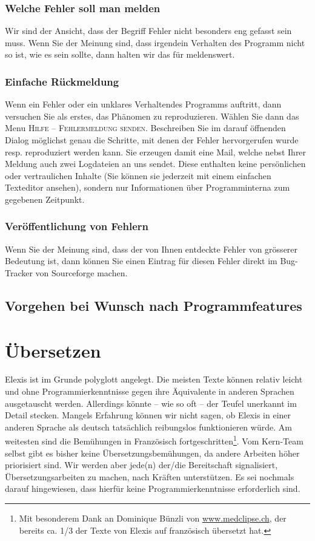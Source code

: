 \subsection{Welche Fehler soll man melden}
Wir sind der Ansicht, dass der Begriff \glqq Fehler\grqq{} nicht besonders eng
gefasst sein muss. Wenn Sie der Meinung sind, dass irgendein Verhalten des
Programm nicht so ist, wie es sein sollte, dann halten wir das für meldenswert.
\subsection{Einfache Rückmeldung}
Wenn ein Fehler oder ein \glqq unklares Verhalten\grqq{}des Programms auftritt,
dann versuchen Sie als erstes, das Phänomen zu reproduzieren. Wählen Sie dann
das Menu \textsc{Hilfe -- Fehlermeldung senden}. Beschreiben Sie im darauf
öffnenden Dialog möglichst genau die Schritte, mit denen der Fehler
hervorgerufen wurde resp. reproduziert werden kann. Sie erzeugen damit eine
Mail, welche nebst Ihrer Meldung auch zwei Logdateien an uns sendet. Diese
enthalten keine persönlichen oder vertraulichen Inhalte (Sie können sie
jederzeit mit einem einfachen Texteditor ansehen), sondern nur Informationen
über Programminterna zum gegebenen Zeitpunkt.
\subsection{Veröffentlichung von Fehlern}
Wenn Sie der Meinung sind, dass der von Ihnen entdeckte Fehler von grösserer
Bedeutung ist, dann können Sie einen Eintrag für diesen Fehler direkt im
Bug-Tracker von Sourceforge machen.
\section{Vorgehen bei Wunsch nach Programmfeatures}

\chapter{Übersetzen}
Elexis ist im Grunde polyglott angelegt. Die meisten Texte können relativ leicht
und ohne Programmierkenntnisse gegen ihre Äquivalente in anderen Sprachen
ausgetauscht werden. Allerdings könnte -- wie so oft -- der Teufel unerkannt im
Detail stecken. Mangels Erfahrung können wir nicht sagen, ob Elexis in einer
anderen Sprache als deutsch tatsächlich reibungslos funktionieren würde. Am
weitesten sind die Bemühungen in Französisch fortgeschritten\footnote{Mit
besonderem Dank an Dominique Bünzli von
\href{http://www.medclipse.ch}{www.medclipse.ch}, der bereits ca. 1/3 der Texte
von Elexis auf französisch übersetzt hat.}.
Vom Kern-Team selbst gibt es bisher keine Übersetzungsbemühungen, da andere
Arbeiten höher priorisiert sind. Wir werden aber jede(n) der/die Bereitschaft
signalisiert, Übersetzungsarbeiten zu machen, nach Kräften unterstützen. Es sei
nochmals darauf hingewiesen, dass hierfür keine Programmierkenntnisse
erforderlich sind.


